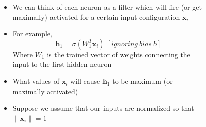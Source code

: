 \begin{frame}
  \begin{columns}
    \begin{overlayarea}{\textwidth}{\textheight}
        \begin{figure}
            
        \end{figure}

    \footnotesize{
    }




    \end{overlayarea}

    \begin{overlayarea}{\textwidth}{\textheight}
         {
            \begin{itemize}\justifying
                  \item <1-> We can think of each neuron as a filter which will fire (or get maximally) activated for a certain input configuration $\textbf{x}_{i}$ 
                  \item <2-> For example, \\
                     \[\textbf{h}_{1} = \sigma(W_{1}^{T}\textbf{x}_{i}) ~ [ignoring ~ bias ~ b]\]
                     Where $W_{1}$ is the trained vector of weights connecting the input to the first hidden neuron 
                  \item <3-> What values of $\textbf{x}_i$ will cause $\textbf{h}_1$ to be maximum (or maximally activated)
                  \item <4-> Suppose we assume that our inputs are normalized so that $\|{\textbf{x}_i}\| = 1$      
            \end{itemize}
        }
    \end{overlayarea}
  \end{columns}
\end{frame}


